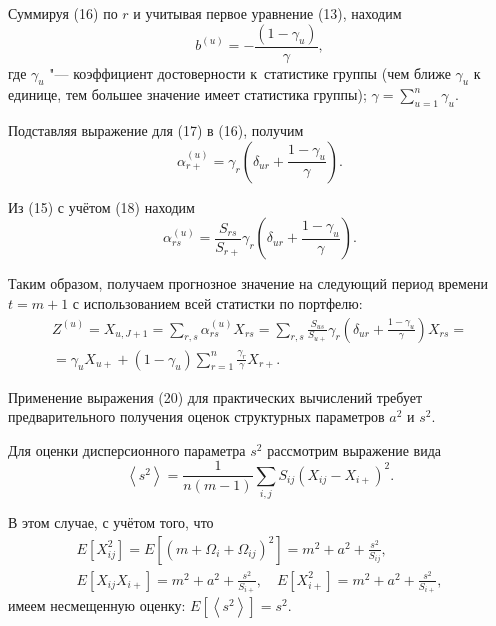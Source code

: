 Суммируя (16) по $r$ и учитывая первое уравнение (13), находим
\begin{equation}
b^{(u)}=-\frac{\left( {1-\gamma _u } \right)}{\gamma },
\end{equation}
где $\gamma _u $ "--- коэффициент достоверности к~статистике группы (чем ближе
$\gamma _u $ к единице, тем большее значение имеет статистика группы);
$\gamma =\sum_{u=1}^n {\gamma _u } $.

Подставляя выражение для (17) в (16), получим
\begin{equation}
\alpha _{r+}^{(u)} =\gamma _r \left( {\delta _{ur} +\frac{1-\gamma _u }{\gamma }} \right).
\end{equation}

Из (15) с учётом (18) находим
\begin{equation}
 \alpha _{rs}^{(u)} =\frac{S_{rs} }{S_{r+} }\gamma _r \left( {\delta _{ur} +\frac{1-\gamma _u }{\gamma }} \right).
\end{equation}

Таким образом, получаем прогнозное значение на следующий период времени
$t=m+1$ с использованием всей статистки по портфелю:
\begin{multline}
Z^{(u)}=X_{u,J+1} =\sum_{r,s} \alpha _{rs}^{(u)}  X_{rs}
=\sum_{r,s} \frac{S_{us} }{S_{u+} }\gamma _r \left( {\delta _{ur} +\frac{1-\gamma _u }{\gamma }} \right)X_{rs} = \\
= \gamma _u X_{u+} +\left( 1-\gamma _u  \right)\sum_{r=1}^n \frac{\gamma _r }{\gamma }X_{r+} .
\end{multline}

Применение выражения (20) для практических вычислений требует
предварительного получения оценок структурных параметров $a^2$ и $s^2$.

Для оценки дисперсионного параметра $s^2$ рассмотрим выражение вида
\begin{equation}
 \left\langle {s^2} \right\rangle =\frac{1}{n(m-1)}\sum_{i,j} {S_{ij} (X_{ij} -X_{i+} )^2} .
\end{equation}

В этом случае, с учётом того, что
\begin{gather*}
E\left[ {X_{ij}^2 } \right]=E\left[ {\left( {m+\Omega _i +\Omega _{ij} }
\right)^2} \right]=m^2+a^2+\frac{s^2}{S_{ij} },\\
E\left[ {X_{ij} X_{i+} } \right]=m^2+a^2+\frac{s^2}{S_{i+} },\quad
E\left[ {X_{i+}^2 } \right]=m^2+a^2+\frac{s^2}{S_{i+} },
\end{gather*}
имеем несмещенную оценку: $E\left[ {\left\langle {s^2} \right\rangle }
\right]=s^2$.

